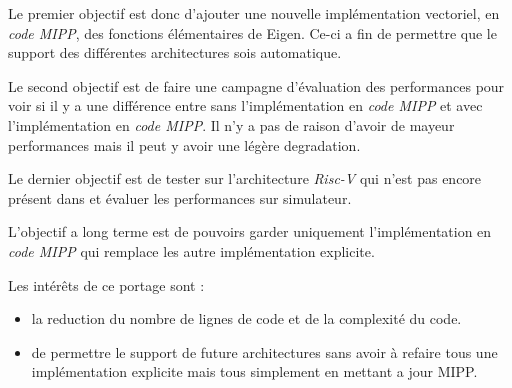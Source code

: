 Le premier objectif est donc d'ajouter une nouvelle implémentation vectoriel, en
\emph{code MIPP}, des fonctions élémentaires de Eigen. Ce-ci a fin de permettre que le
support des différentes architectures sois automatique.

Le second objectif est de faire une campagne d'évaluation des performances pour voir si
il y a une différence entre \Eigen sans l'implémentation en \emph{code MIPP} et
\Eigen avec l'implémentation en \emph{code MIPP}. Il n'y a pas de raison d'avoir
de mayeur performances mais il peut y avoir une légère degradation.

Le dernier objectif est de tester \Eigen sur l'architecture \emph{Risc-V} qui n'est
pas encore présent dans \Eigen et évaluer les performances sur simulateur.

L'objectif a long terme est de pouvoirs garder uniquement l'implémentation en
\emph{code MIPP} qui remplace les autre implémentation explicite.

Les intérêts de ce portage sont :
\begin{itemize}
  \item la reduction du nombre de lignes de code et de la complexité du code.
  \item de permettre le support de future architectures sans avoir à refaire tous une
  implémentation explicite mais tous simplement en mettant a jour MIPP.
\end{itemize}
